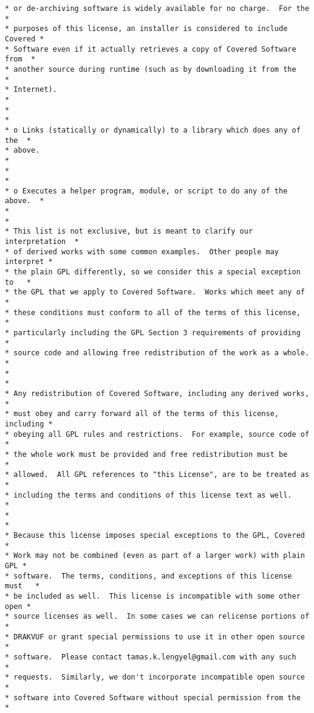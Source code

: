 {\begin{lstlisting}[style=CStyle]
* or de-archiving software is widely available for no charge.  For the    *
* purposes of this license, an installer is considered to include Covered *
* Software even if it actually retrieves a copy of Covered Software from  *
* another source during runtime (such as by downloading it from the       *
* Internet).                                                              *
*                                                                         *
* o Links (statically or dynamically) to a library which does any of the  *
* above.                                                                  *
*                                                                         *
* o Executes a helper program, module, or script to do any of the above.  *
*                                                                         *
* This list is not exclusive, but is meant to clarify our interpretation  *
* of derived works with some common examples.  Other people may interpret *
* the plain GPL differently, so we consider this a special exception to   *
* the GPL that we apply to Covered Software.  Works which meet any of     *
* these conditions must conform to all of the terms of this license,      *
* particularly including the GPL Section 3 requirements of providing      *
* source code and allowing free redistribution of the work as a whole.    *
*                                                                         *
* Any redistribution of Covered Software, including any derived works,    *
* must obey and carry forward all of the terms of this license, including *
* obeying all GPL rules and restrictions.  For example, source code of    *
* the whole work must be provided and free redistribution must be         *
* allowed.  All GPL references to "this License", are to be treated as    *
* including the terms and conditions of this license text as well.        *
*                                                                         *
* Because this license imposes special exceptions to the GPL, Covered     *
* Work may not be combined (even as part of a larger work) with plain GPL *
* software.  The terms, conditions, and exceptions of this license must   *
* be included as well.  This license is incompatible with some other open *
* source licenses as well.  In some cases we can relicense portions of    *
* DRAKVUF or grant special permissions to use it in other open source     *
* software.  Please contact tamas.k.lengyel@gmail.com with any such       *
* requests.  Similarly, we don't incorporate incompatible open source     *
* software into Covered Software without special permission from the      *

\end{lstlisting}}
